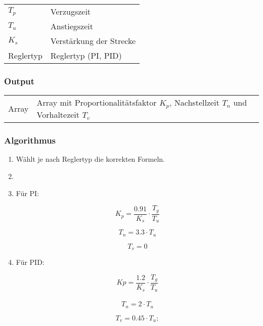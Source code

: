 \begin{tabular}{p{40mm}l}
    $ T_p $        & Verzugszeit \\
    $ T_u $        & Anstiegszeit \\
    $ K_s $        & Verst\"arkung der Strecke \\
      Reglertyp    & Reglertyp (PI, PID)
\end{tabular}

\subsubsection*{Output}
\begin{tabular}{p{40mm}l}
    Array & \parbox[t][4em][s]{0.7\textwidth}{Array mit Proportionalit\"atsfaktor $ K_p $, Nachstellzeit $ T_n $ und Vorhaltezeit $ T_v $}
\end{tabular}

\subsubsection*{Algorithmus}
\begin{enumerate}
    \item
        W\"ahlt je nach Reglertyp die korrekten Formeln.
    \item
    \item
        F\"ur PI:

        \begin{equation*}
            K_p= \frac{0.91}{K_s} \cdot \frac{T_g}{T_u}
        \end{equation*}

        \begin{equation*}
            T_n=3.3 \cdot T_u
        \end{equation*}

        \begin{equation*}
            T_v=0
        \end{equation*}
    \item
        F\"ur PID:

        \begin{equation*}
            Kp = \frac{1.2}{K_s} \cdot \frac{T_g}{T_u}
        \end{equation*}  \\

        \begin{equation*}
            T_n=2 \cdot T_u
        \end{equation*}

        \begin{equation*}
            T_v=0.45 \cdot T_u;
        \end{equation*}
\end{enumerate}

